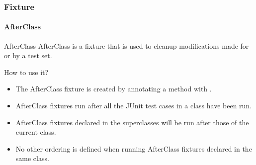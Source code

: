\begin{frame}[parent={concept:fixture}, hasprev=false, hasnext=false]
\frametitle{Fixture}
\framesubtitle{AfterClass}
\label{concept:junit-afterclass-fixture}
\label{concept:afterclass-fixture}
\label{concept:afterclass}

\begin{block:concept}{AfterClass}
AfterClass is a fixture that is used to cleanup modifications made
for or by a test set.
\end{block:concept}


\begin{block:fact}{How to use it?}
\begin{itemize}
	\item The AfterClass fixture is created by annotating a method with
	.

	\item AfterClass fixtures run after all the JUnit test cases in a class
	have been run.

	\item AfterClass fixtures declared in the superclasses will be run after
	those of the current class.

	\item No other ordering is defined when running AfterClass fixtures
	declared in the same class.
\end{itemize}
\end{block:fact}
\end{frame}